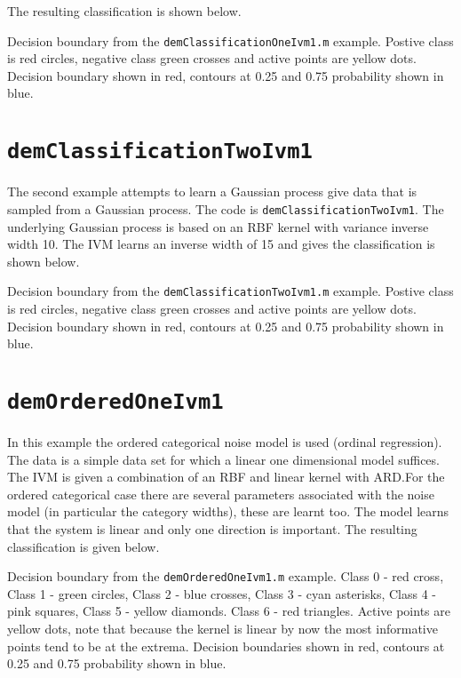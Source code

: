 The resulting classification is shown below.

\begin{center}

Decision boundary from the \texttt{demClassificationOneIvm1.m} example. Postive class is red circles, negative class green crosses and active points are yellow dots. Decision boundary shown in red, contours at 0.25 and 0.75 probability shown in blue.\end{center}




\section{\texttt{demClassificationTwoIvm1}}

The second example attempts to learn a Gaussian process give data that is sampled from a Gaussian process. The code is \texttt{demClassificationTwoIvm1}. The underlying Gaussian process is based on an RBF kernel with variance inverse width 10. The IVM learns an inverse width of 15 and gives the classification is shown below.

\begin{center}

Decision boundary from the \texttt{demClassificationTwoIvm1.m} example. Postive class is red circles, negative class green crosses and active points are yellow dots. Decision boundary shown in red, contours at 0.25 and 0.75 probability shown in blue.\end{center}


\section{\texttt{demOrderedOneIvm1}}

In this example the ordered categorical noise model is used (ordinal regression). The data is a simple data set for which a linear one dimensional model suffices. The IVM is given a combination of an RBF and linear kernel with ARD.For the ordered categorical case there are several parameters associated with the noise model (in particular the category widths), these are learnt too. The model learns that the system is linear and only one direction is important. The resulting classification is given below.



\begin{center}

Decision boundary from the \texttt{demOrderedOneIvm1.m} example. Class 0 - red cross, Class 1 - green circles, Class 2 - blue crosses, Class 3 - cyan asterisks, Class 4 - pink squares, Class 5 - yellow diamonds. Class 6 - red triangles. Active points are yellow dots, note that because the kernel is linear by now the most informative points tend to be at the extrema. Decision boundaries shown in red, contours at 0.25 and 0.75 probability shown in blue.\end{center}



